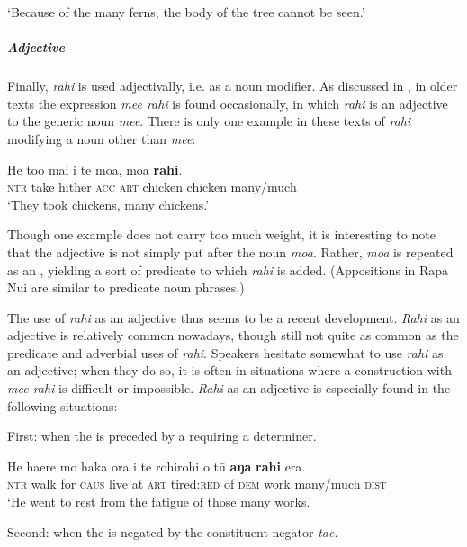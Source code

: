 \glt 
‘Because of the many ferns, the body of the tree cannot be seen.’ \textstyleExampleref{[R497.005]} 
\z

\subparagraph{Adjective} Finally, \textit{rahi} is used adjectivally, i.e. as a noun modifier. As discussed in , in older texts the expression \textit{me{\ꞌ}e rahi} is found occasionally, in which \textit{rahi} is an adjective to the generic noun \textit{me{\ꞌ}e}. There is only one example in these texts of \textit{rahi} modifying a noun other than \textit{me{\ꞌ}e}:

\ea\label{ex:4.101}
\gll He to{\ꞌ}o mai i te moa, moa \textbf{rahi}. \\
\textsc{ntr} take hither \textsc{acc} \textsc{art} chicken chicken many/much \\

\glt
‘They took chickens, many chickens.’ \textstyleExampleref{[Ley-9-55.012]}
\z

Though one example does not carry too much weight, it is interesting to note that the adjective is not simply put after the noun \textit{moa}. Rather, \textit{moa} is repeated as an , yielding a sort of predicate  to which \textit{rahi} is added. (Appositions in Rapa Nui are similar to predicate noun phrases.)

The use of \textit{rahi} as an adjective thus seems to be a recent development. \textit{Rahi} as an adjective is relatively common nowadays, though still not quite as common as the predicate and adverbial uses of \textit{rahi}. Speakers hesitate somewhat to use \textit{rahi} as an adjective; when they do so, it is often in situations where a construction with \textit{me{\ꞌ}e rahi} is difficult or impossible. \textit{Rahi} as an adjective is especially found in the following situations:

First: when the  is preceded by a  requiring a determiner.

\ea\label{ex:4.102}
\gll He ha{\ꞌ}ere mo haka ora {\ꞌ}i te rohirohi o tū \textbf{aŋa} \textbf{rahi} era.\\
\textsc{ntr} walk for \textsc{caus} live at \textsc{art} tired:\textsc{red} of \textsc{dem} work many/much \textsc{dist}\\

\glt
‘He went to rest from the fatigue of those many works.’ \textstyleExampleref{[R233.069]} 
\z

Second: when the  is negated by the constituent negator \textit{ta{\ꞌ}e}.

